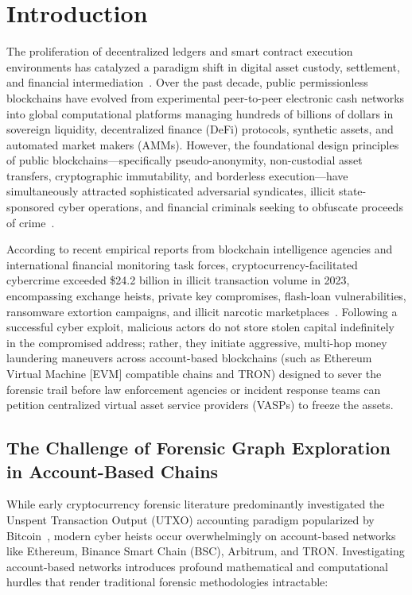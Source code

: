 \section{Introduction}
\label{sec:introduction}

The proliferation of decentralized ledgers and smart contract execution environments has catalyzed a paradigm shift in digital asset custody, settlement, and financial intermediation~\cite{nakamoto2008bitcoin, wood2014ethereum}. Over the past decade, public permissionless blockchains have evolved from experimental peer-to-peer electronic cash networks into global computational platforms managing hundreds of billions of dollars in sovereign liquidity, decentralized finance (DeFi) protocols, synthetic assets, and automated market makers (AMMs). However, the foundational design principles of public blockchains---specifically pseudo-anonymity, non-custodial asset transfers, cryptographic immutability, and borderless execution---have simultaneously attracted sophisticated adversarial syndicates, illicit state-sponsored cyber operations, and financial criminals seeking to obfuscate proceeds of crime~\cite{chainalysis2024crime, elliptic2023typologies}.

According to recent empirical reports from blockchain intelligence agencies and international financial monitoring task forces, cryptocurrency-facilitated cybercrime exceeded \$24.2 billion in illicit transaction volume in 2023, encompassing exchange heists, private key compromises, flash-loan vulnerabilities, ransomware extortion campaigns, and illicit narcotic marketplaces~\cite{fatf2021virtual, chainalysis2024crime}. Following a successful cyber exploit, malicious actors do not store stolen capital indefinitely in the compromised address; rather, they initiate aggressive, multi-hop money laundering maneuvers across account-based blockchains (such as Ethereum Virtual Machine [EVM] compatible chains and TRON) designed to sever the forensic trail before law enforcement agencies or incident response teams can petition centralized virtual asset service providers (VASPs) to freeze the assets.

\subsection{The Challenge of Forensic Graph Exploration in Account-Based Chains}

While early cryptocurrency forensic literature predominantly investigated the Unspent Transaction Output (UTXO) accounting paradigm popularized by Bitcoin~\cite{meiklejohn2013fistful, ron2013quantitative, kalodner2020blocksci}, modern cyber heists occur overwhelmingly on account-based networks like Ethereum, Binance Smart Chain (BSC), Arbitrum, and TRON. Investigating account-based networks introduces profound mathematical and computational hurdles that render traditional forensic methodologies intractable:

